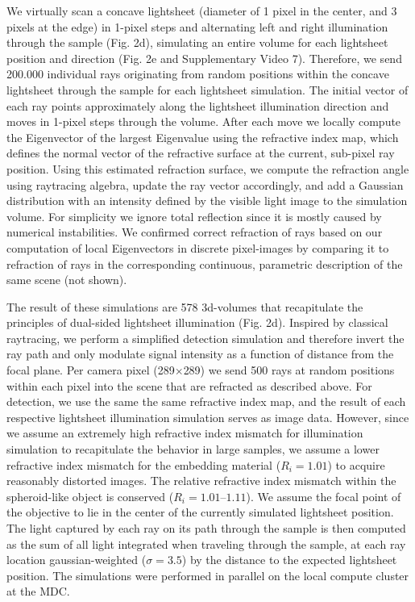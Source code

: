 We virtually scan a concave lightsheet (diameter of 1 pixel in the center, and 3 pixels at the edge) in 1-pixel steps and alternating left and right illumination through the sample (Fig. 2d), simulating an entire volume for each lightsheet position and direction (Fig. 2e and Supplementary Video 7). Therefore, we send 200.000 individual rays originating from random positions within the concave lightsheet through the sample for each lightsheet simulation. The initial vector of each ray points approximately along the lightsheet illumination direction and moves in 1-pixel steps through the volume. After each move we locally compute the Eigenvector of the largest Eigenvalue using the refractive index map, which defines the normal vector of the refractive surface at the current, sub-pixel ray position. Using this estimated refraction surface, we compute the refraction angle using raytracing algebra\cite{raytracing}, update the ray vector accordingly, and add a Gaussian distribution with an intensity defined by the visible light image to the simulation volume. For simplicity we ignore total reflection since it is mostly caused by numerical instabilities. We confirmed correct refraction of rays based on our computation of local Eigenvectors in discrete pixel-images by comparing it to refraction of rays in the corresponding continuous, parametric description of the same scene (not shown). 

The result of these simulations are 578 3d-volumes that recapitulate the principles of dual-sided lightsheet illumination (Fig. 2d). Inspired by classical raytracing, we perform a simplified detection simulation and therefore invert the ray path and only modulate signal intensity as a function of distance from the focal plane. Per camera pixel (289$\times$289) we send 500 rays at random positions within each pixel into the scene that are refracted as described above. For detection, we use the same the same refractive index map, and the result of each respective lightsheet illumination simulation serves as image data. However, since we assume an extremely high refractive index mismatch for illumination simulation to recapitulate the behavior in large samples, we assume a lower refractive index mismatch for the embedding material ($R_i=1.01$) to acquire reasonably distorted images. The relative refractive index mismatch within the spheroid-like object is conserved ($R_i=1.01 – 1.11$). We assume the focal point of the objective to lie in the center of the currently simulated lightsheet position. The light captured by each ray on its path through the sample is then computed as the sum of all light integrated when traveling through the sample, at each ray location  gaussian-weighted ($\sigma=3.5$) by the distance to the expected lightsheet position. The simulations were performed in parallel on the local compute cluster at the MDC.


